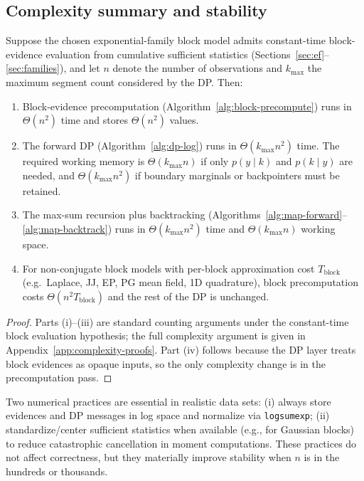 \subsection{Complexity summary and stability}
\label{sec:alg-complexity}

\begin{proposition}
\label{prop:bb-complexity}
Suppose the chosen exponential-family block model admits constant-time block-evidence evaluation
from cumulative sufficient statistics (Sections~\ref{sec:ef}--\ref{sec:families}), and let
$n$ denote the number of observations and $k_{\max}$ the maximum segment count considered by the
DP. Then:
\begin{enumerate}
\item Block-evidence precomputation (Algorithm~\ref{alg:block-precompute}) runs in $\Theta(n^2)$ time and stores $\Theta(n^2)$ values.
\item The forward DP (Algorithm~\ref{alg:dp-log}) runs in $\Theta(k_{\max}n^2)$ time. The required working memory is $\Theta(k_{\max}n)$ if only $p(y\mid k)$ and $p(k\mid y)$ are needed, and $\Theta(k_{\max}n^2)$ if boundary marginals or backpointers must be retained.
\item The max-sum recursion plus backtracking (Algorithms~\ref{alg:map-forward}--\ref{alg:map-backtrack}) runs in $\Theta(k_{\max}n^2)$ time and $\Theta(k_{\max}n)$ working space.
\item For non-conjugate block models with per-block approximation cost $T_{\mathrm{block}}$ (e.g.\ Laplace, JJ, EP, PG mean field, 1D quadrature), block precomputation costs $\Theta(n^2 T_{\mathrm{block}})$ and the rest of the DP is unchanged.
\end{enumerate}
\end{proposition}

\begin{proof}
Parts (i)--(iii) are standard counting arguments under the constant-time
block evaluation hypothesis; the full complexity argument is given in
Appendix~\ref{app:complexity-proofs}. Part (iv) follows because the DP layer
treats block evidences as opaque inputs, so the only complexity change is in
the precomputation pass.
\end{proof}

Two numerical practices are essential in realistic data sets:
(i) always store evidences and DP messages in log space and normalize via \texttt{logsumexp};
(ii) standardize/center sufficient statistics when available (e.g., for Gaussian blocks) to
reduce catastrophic cancellation in moment computations.
These practices do not affect correctness, but they materially improve stability when $n$ is
in the hundreds or thousands.

